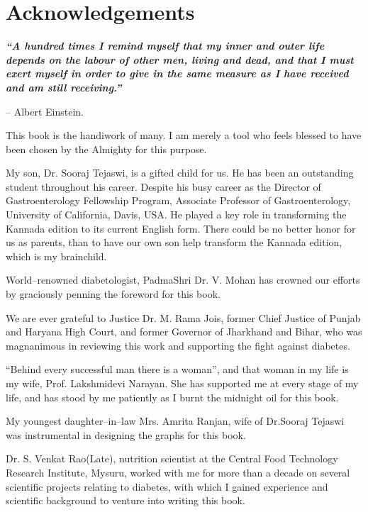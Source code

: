 
\chapter*{Acknowledgements}

\begin{myquote}
\textbf{\textit{“A hundred times I remind myself that my inner and outer life depends on the labour of other men, living and dead, and that I must exert myself in order to give in the same measure as I have received and am still receiving.”}} 
\begin{flushright}
– Albert Einstein.
\end{flushright}
\end{myquote}

This book is the handiwork of many. I am merely a tool who feels blessed to have been chosen by the Almighty for this purpose.

My son, Dr. Sooraj Tejaswi, is a gifted child for us. He has been an outstanding student throughout his career. Despite his busy career as the Director of Gastroenterology Fellowship Program, Associate Professor of Gastroenterology, University of California, Davis, USA. He played a key role in transforming the Kannada edition to its current English form. There could be no better honor for us as parents, than to have our own son help transform the Kannada edition, which is my brainchild.

World–renowned diabetologist, PadmaShri Dr. V. Mohan has crowned our efforts by graciously penning the foreword for this book.

We are ever grateful to Justice Dr. M. Rama Jois, former Chief Justice of Punjab and Haryana High Court, and former Governor of Jharkhand and Bihar, who was magnanimous in reviewing this work and supporting the fight against diabetes.

“Behind every successful man there is a woman”, and that woman in my life is my wife, Prof. Lakshmidevi Narayan. She has supported me at every stage of my life, and has stood by me patiently as I burnt the midnight oil for this book.

My youngest daughter–in–law Mrs. Amrita Ranjan, wife of Dr.Sooraj Tejaswi was instrumental in designing the graphs for this book.

Dr. S. Venkat Rao(Late), nutrition scientist at the Central Food Technology Research Institute, Mysuru, worked with me for more than a decade on several scientific projects relating to diabetes, with which I gained experience and scientific background to venture into writing this book.


